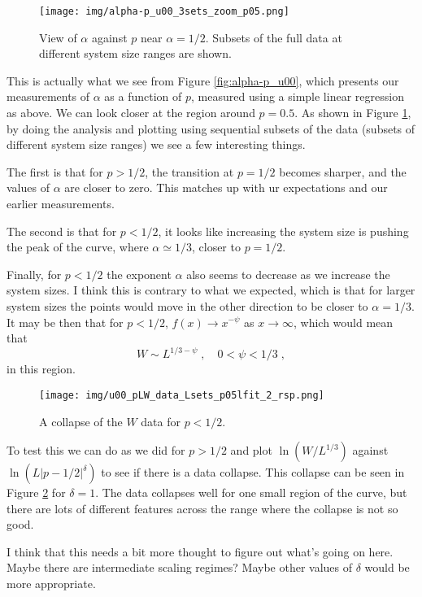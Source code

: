 \documentclass[a4paper,10pt]{article}
\newcommand{\fref}[1]{Figure \ref{#1}}
\begin{document}
\begin{figure}[h!]
 \centering
 \texttt{[image: img/alpha-p\_u00\_3sets\_zoom\_p05.png]}
 \caption{View of $\alpha$ against $p$ near $\alpha =1/2$. Subsets of the full data at different system size ranges are shown.}
 \label{fig:alpha-p_u00_3sets_zoom_p05}
\end{figure}
This is actually what we see from \fref{fig:alpha-p_u00}, which presents our measurements of $\alpha$ as a function of $p$, measured using a simple linear regression as above. We can look closer at the region around $p=0.5$. As shown in \fref{fig:alpha-p_u00_3sets_zoom_p05}, by doing the analysis and plotting using sequential subsets of the data (subsets of different system size ranges) we see a few interesting things. 

The first is that for $p>1/2$, the transition at $p=1/2$ becomes sharper, and the values of $\alpha$ are closer to zero. This matches up with ur expectations and our earlier measurements. 

The second is that for $p < 1/2$, it looks like increasing the system size is pushing the peak of the curve, where $\alpha\simeq1/3$, closer to $p = 1/2$.

Finally, for $p<1/2$ the exponent $\alpha$ also seems to decrease as we increase the system sizes. I think this is contrary to what we expected, which is that for larger system sizes the points would move in the other direction to be closer to $\alpha = 1/3$. It may be then that for $p < 1/2$, $f(x) \to x^{-\psi}$ as $x \to\infty$, which would mean that 
\begin{equation}
  W \sim L^{1/3-\psi} \;, \quad 0 < \psi < 1/3 \;,  
\end{equation}
in this region.

\begin{figure}[h!]
 \centering
 \texttt{[image: img/u00\_pLW\_data\_Lsets\_p05lfit\_2\_rsp.png]}
 \caption{A collapse of the $W$ data for $p < 1/2$.}
 \label{fig:u00_pLW_data_Lsets_p05lfit_2_rsp}
\end{figure}
To test this we can do as we did for $p>1/2$ and plot $\ln(W/L^{1/3})$ against $\ln(L|p-1/2|^\delta)$ to see if there is a data collapse. This collapse can be seen in \fref{fig:u00_pLW_data_Lsets_p05lfit_2_rsp} for $\delta=1$. The data collapses well for one small region of the curve, but there are lots of different features across the range where the collapse is not so good. 

I think that this needs a bit more thought to figure out what's going on here. Maybe there are intermediate scaling regimes? Maybe other values of $\delta$ would be more appropriate.

\end{document}
